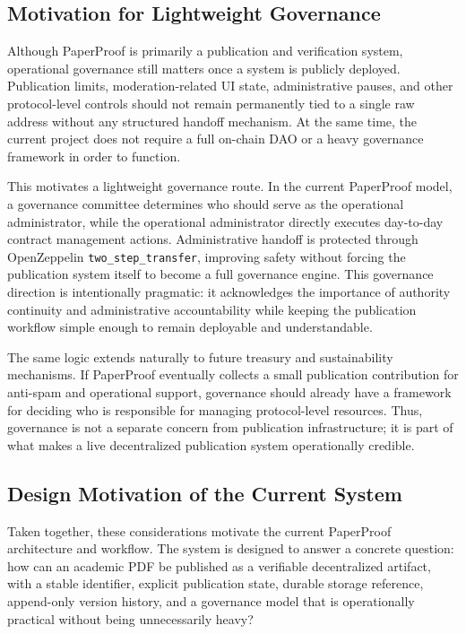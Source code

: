 \documentclass[journal]{IEEEtran}
\begin{document}
\subsection{Motivation for Lightweight Governance}

Although PaperProof is primarily a publication and verification system, operational governance still matters once a system is publicly deployed. Publication limits, moderation-related UI state, administrative pauses, and other protocol-level controls should not remain permanently tied to a single raw address without any structured handoff mechanism. At the same time, the current project does not require a full on-chain DAO or a heavy governance framework in order to function.

This motivates a lightweight governance route. In the current PaperProof model, a governance committee determines who should serve as the operational administrator, while the operational administrator directly executes day-to-day contract management actions. Administrative handoff is protected through OpenZeppelin \texttt{two\_step\_transfer}, improving safety without forcing the publication system itself to become a full governance engine. This governance direction is intentionally pragmatic: it acknowledges the importance of authority continuity and administrative accountability while keeping the publication workflow simple enough to remain deployable and understandable.

The same logic extends naturally to future treasury and sustainability mechanisms. If PaperProof eventually collects a small publication contribution for anti-spam and operational support, governance should already have a framework for deciding who is responsible for managing protocol-level resources. Thus, governance is not a separate concern from publication infrastructure; it is part of what makes a live decentralized publication system operationally credible.

\subsection{Design Motivation of the Current System}

Taken together, these considerations motivate the current PaperProof architecture and workflow. The system is designed to answer a concrete question: how can an academic PDF be published as a verifiable decentralized artifact, with a stable identifier, explicit publication state, durable storage reference, append-only version history, and a governance model that is operationally practical without being unnecessarily heavy?
\end{document}
